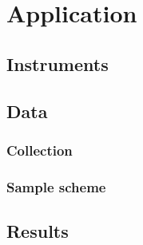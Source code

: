 \chapter{Application} \label{chap:application}

\section{Instruments}



\section{Data}

\subsection{Collection}

\subsection{Sample scheme}



\section{Results}

